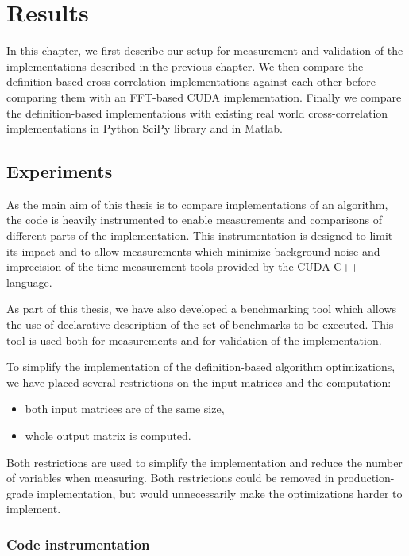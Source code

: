 \chapter{Results}

In this chapter, we first describe our setup for measurement and validation of the implementations described in the previous chapter. We then compare the definition-based cross-correlation implementations against each other before comparing them with an FFT-based CUDA implementation. Finally we compare the definition-based implementations with existing real world cross-correlation implementations in Python SciPy library and in Matlab.

\section{Experiments}
As the main aim of this thesis is to compare implementations of an algorithm, the code is heavily instrumented to enable measurements and comparisons of different parts of the implementation. This instrumentation is designed to limit its impact and to allow measurements which minimize background noise and imprecision of the time measurement tools provided by the CUDA C++ language.

As part of this thesis, we have also developed a benchmarking tool which allows the use of declarative description of the set of benchmarks to be executed. This tool is used both for measurements and for validation of the implementation.


To simplify the implementation of the definition-based algorithm optimizations, we have placed several restrictions on the input matrices and the computation:
\begin{itemize}
	\item both input matrices are of the same size,
	\item whole output matrix is computed.
\end{itemize}

Both restrictions are used to simplify the implementation and reduce the number of variables when measuring. Both restrictions could be removed in production-grade implementation, but would unnecessarily make the optimizations harder to implement. 

\subsection{Code instrumentation}

